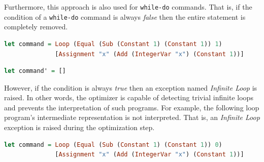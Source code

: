 \documentclass[12pt,a4paper]{article}
\begin{document}
Furthermore, this approach is also used for \texttt{while-do} commands.
That is, if the condition of a \texttt{while-do} command is always \textit{false} then the entire statement is completely removed.
\begin{lstlisting}[language=Haskell, style=custom-style]
let command = Loop (Equal (Sub (Constant 1) (Constant 1)) 1)
              [Assignment "x" (Add (IntegerVar "x") (Constant 1))]
\end{lstlisting}
\begin{lstlisting}[language=Haskell, style=custom-style]
let command' = []
\end{lstlisting}
However, if the condition is always \textit{true} then an exception named \textit{Infinite Loop} is raised.
In other words, the optimizer is capable of detecting trivial infinite loops and prevents the interpretation of such programs.
For example, the following loop program's intermediate representation is not interpreted.
That is, an \textit{Infinite Loop} exception is raised during the optimization step.
\begin{lstlisting}[language=Haskell, style=custom-style]
let command = Loop (Equal (Sub (Constant 1) (Constant 1)) 0)
              [Assignment "x" (Add (IntegerVar "x") (Constant 1))]
\end{lstlisting}

\clearpage
\end{document}
